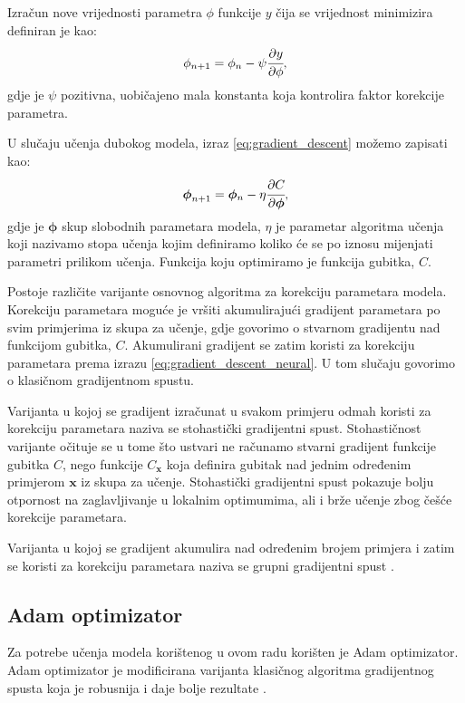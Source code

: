 \documentclass[times, utf8, diplomski, numeric]{fer}
\begin{document}
Izračun nove vrijednosti parametra $\phi$ funkcije $y$ čija se vrijednost minimizira definiran je kao:
\begin{equation}
 \phi_{n+1} = \phi_n - \psi \cfrac{\partial y}{\partial \phi}, \label{eq:gradient_descent}
\end{equation}
gdje je $\psi$ pozitivna, uobičajeno mala konstanta koja kontrolira faktor korekcije parametra.

\noindent U slučaju učenja dubokog modela, izraz \ref{eq:gradient_descent} možemo zapisati kao:
\begin{equation}
 \boldsymbol{\phi}_{n+1} = \boldsymbol{\phi}{_n} - \eta \cfrac{\partial C}{\partial \boldsymbol{\phi}}, \label{eq:gradient_descent_neural}
\end{equation}
gdje je $\boldsymbol{\phi}$ skup slobodnih parametara modela, $\eta$ je parametar algoritma učenja koji nazivamo stopa učenja  kojim definiramo koliko će se po iznosu mijenjati parametri prilikom učenja.
Funkcija koju optimiramo je funkcija gubitka, $C$.

Postoje različite varijante osnovnog algoritma za korekciju parametara modela. 
Korekciju parametara moguće je vršiti akumulirajući gradijent parametara po svim primjerima iz skupa za učenje, gdje govorimo o stvarnom gradijentu nad funkcijom gubitka, $C$. 
Akumulirani gradijent se zatim koristi za korekciju parametara prema izrazu \ref{eq:gradient_descent_neural}. U tom slučaju govorimo o klasičnom gradijentnom spustu.

Varijanta u kojoj se gradijent izračunat u svakom primjeru odmah koristi za korekciju parametara naziva se stohastički gradijentni spust. 
Stohastičnost varijante očituje se u tome što ustvari ne računamo stvarni gradijent funkcije gubitka $C$, nego funkcije $C_\mathbf{x}$ koja definira gubitak nad jednim određenim primjerom $\mathbf{x}$ iz skupa za učenje.
Stohastički gradijentni spust pokazuje bolju otpornost na zaglavljivanje u lokalnim optimumima, ali i brže učenje zbog češće korekcije parametara.

Varijanta u kojoj se gradijent akumulira nad određenim brojem primjera i zatim se koristi za korekciju parametara naziva se grupni  gradijentni spust \citep{seminar:rela}.

\subsection{Adam optimizator}
Za potrebe učenja modela korištenog u ovom radu korišten je Adam optimizator. 
Adam optimizator je modificirana varijanta klasičnog algoritma gradijentnog spusta koja je robusnija i daje bolje rezultate \citep{article:adam}.
\end{document}
